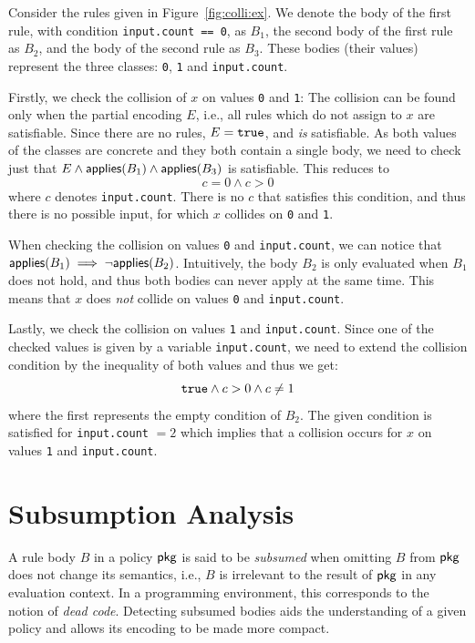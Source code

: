 \begin{example}
  Consider the rules given in Figure~\ref{fig:colli:ex}.
  We denote the body of the first rule, with condition \texttt{input.count == 0}, as $B_1$, the second body of the first rule as $B_2$, and the body of the second rule as $B_3$.
  These bodies (their values) represent the three classes: \texttt{0}, \texttt{1} and \texttt{input.count}.

  Firstly, we check the collision of $x$ on values \texttt{0} and \texttt{1}:
  The collision can be found only when the partial encoding $E$, i.e., all rules which do not assign to $x$ are satisfiable.
  Since there are no rules, $E = \texttt{true}$, and \emph{is} satisfiable.
  As both values of the classes are concrete and they both contain a single body, we need to check just that $E \land \mathsf{applies}(B_1) \land \mathsf{applies}(B_3)$ is satisfiable.
  This reduces to $$c = 0 \land c > 0$$ where $c$ denotes \texttt{input.count}.
  There is no $c$ that satisfies this condition, and thus there is no possible input, for which $x$ collides on \texttt{0} and \texttt{1}.

  When checking the collision on values \texttt{0} and \texttt{input.count}, we can notice that $\mathsf{applies}(B_1) \implies \neg\mathsf{applies}(B_2)$.
  Intuitively, the body $B_2$ is only evaluated when $B_1$ does not hold, and thus both bodies can never apply at the same time.
  This means that $x$ does \emph{not} collide on values \texttt{0} and \texttt{input.count}.

  Lastly, we check the collision on values \texttt{1} and \texttt{input.count}.
  Since one of the checked values is given by a variable \texttt{input.count}, we need to extend the collision condition by the inequality of both values and thus we get:
  $$\texttt{true} \land c > 0 \land c \neq 1$$
  where the first \true represents the empty condition of $B_2$.
  The given condition is satisfied for \texttt{input.count} $= 2$ which implies that a collision occurs for $x$ on values \texttt{1} and \texttt{input.count}.
\end{example}

\section{Subsumption Analysis}
\label{s:subsumption}

A rule body $B$ in a policy $\mathsf{pkg}$ is said to be \emph{subsumed} when omitting $B$ from $\mathsf{pkg}$ does not change its semantics, i.e., $B$ is irrelevant to the result of $\mathsf{pkg}$ in any evaluation context.
In a programming environment, this corresponds to the notion of \emph{dead code}.
Detecting subsumed bodies aids the understanding of a given policy and allows its encoding to be made more compact.

